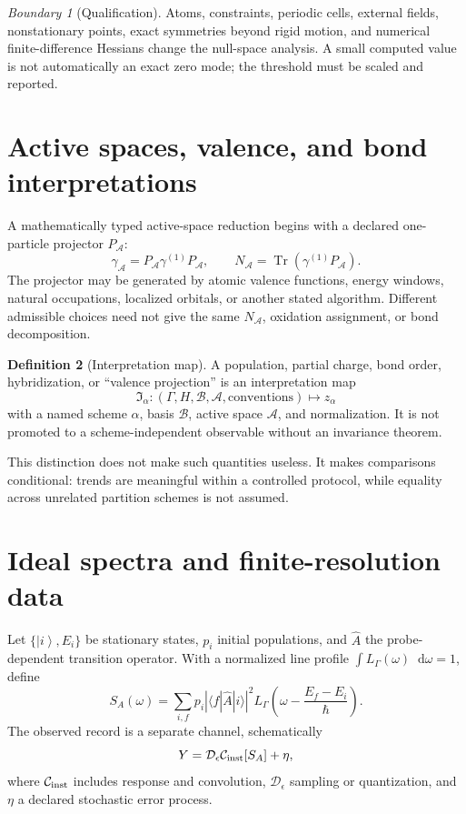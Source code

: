 \documentclass[11pt,a4paper]{article}
\theoremstyle{definition}
\newtheorem{definition}{Definition}[section]
\theoremstyle{plain}
\theoremstyle{remark}
\newtheorem{warning}[definition]{Boundary}
\newcommand{\dd}{\mathop{}\!\mathrm d}
\newcommand{\abs}[1]{\left\lvert #1\right\rvert}
\newcommand{\Acal}{\mathcal A}
\newcommand{\Bcal}{\mathcal B}
\newcommand{\Tr}{\operatorname{Tr}}
\newcommand{\ket}[1]{\left\lvert #1\right\rangle}
\begin{document}
\begin{warning}[Qualification]
Atoms, constraints, periodic cells, external fields, nonstationary
points, exact symmetries beyond rigid motion, and numerical
finite-difference Hessians change the null-space analysis.  A small
computed value is not automatically an exact zero mode; the threshold
must be scaled and reported.
\end{warning}

\section{Active spaces, valence, and bond interpretations}

A mathematically typed active-space reduction begins with a declared
one-particle projector \(P_{\Acal}\):
\begin{equation}\label{eq:active-rdm}
\gamma_{\Acal}
=P_{\Acal}\gamma^{(1)}P_{\Acal},
\qquad
N_{\Acal}=\Tr(\gamma^{(1)}P_{\Acal}).
\end{equation}
The projector may be generated by atomic valence functions, energy
windows, natural occupations, localized orbitals, or another stated
algorithm.  Different admissible choices need not give the same
\(N_{\Acal}\), oxidation assignment, or bond decomposition.

\begin{definition}[Interpretation map]
A population, partial charge, bond order, hybridization, or
``valence projection'' is an interpretation map
\[
\mathfrak I_\alpha:
(\Gamma,H,\Bcal,\Acal,\text{conventions})
\longmapsto z_\alpha
\]
with a named scheme \(\alpha\), basis \(\Bcal\), active space
\(\Acal\), and normalization.  It is not promoted to a
scheme-independent observable without an invariance theorem.
\end{definition}

This distinction does not make such quantities useless.  It makes
comparisons conditional: trends are meaningful within a controlled
protocol, while equality across unrelated partition schemes is not
assumed.

\section{Ideal spectra and finite-resolution data}

Let \(\{\ket i,E_i\}\) be stationary states, \(p_i\) initial
populations, and \(\widehat A\) the probe-dependent transition
operator.  With a normalized line profile
\(\int L_\Gamma(\omega)\dd\omega=1\), define
\begin{equation}\label{eq:ideal-spectrum}
S_A(\omega)
=\sum_{i,f}p_i
\abs{\langle f|\widehat A|i\rangle}^2
L_\Gamma\!\left(
\omega-\frac{E_f-E_i}{\hbar}
\right).
\end{equation}
The observed record is a separate channel, schematically
\begin{equation}\label{eq:instrument-channel}
Y
=\mathcal D_\epsilon
\mathcal C_{\rm inst}[S_A]+\eta,
\end{equation}
where \(\mathcal C_{\rm inst}\) includes response and convolution,
\(\mathcal D_\epsilon\) sampling or quantization, and \(\eta\) a
declared stochastic error process.
\end{document}
